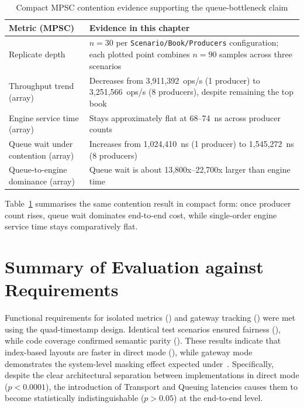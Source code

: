 \begin{table}[htbp]
    \centering
    \small
    \begin{tabular}{p{}p{}}
        \toprule
        \textbf{Metric (MPSC)} & \textbf{Evidence in this chapter} \\
        \midrule
        Replicate depth & $n=30$ per \texttt{Scenario/Book/Producers} configuration; each plotted point combines $n=90$ samples across three scenarios \\
        Throughput trend (array) & Decreases from 3,911,392~ops/s (1 producer) to 3,251,566~ops/s (8 producers), despite remaining the top book \\
        Engine service time (array) & Stays approximately flat at 68--74~ns across producer counts \\
        Queue wait under contention (array) & Increases from 1,024,410~ns (1 producer) to 1,545,272~ns (8 producers) \\
        Queue-to-engine dominance (array) & Queue wait is about 13,800x--22,700x larger than engine time \\
        \bottomrule
    \end{tabular}
    \caption{Compact MPSC contention evidence supporting the queue-bottleneck claim}
    \label{tab:mpsc_compact_evidence}
\end{table}

Table~\ref{tab:mpsc_compact_evidence} summarises the same contention result in
compact form: once producer count rises, queue wait dominates end-to-end cost,
while single-order engine service time stays comparatively flat.
\section{Summary of Evaluation against Requirements}
\label{sec:nfr_summary}

Functional requirements for isolated metrics () and gateway 
tracking () were met using the quad-timestamp design. 
Identical test scenarios ensured fairness (), while code coverage confirmed 
semantic parity (). These results indicate that index-based layouts are 
faster in direct mode (), while gateway mode demonstrates the 
system-level masking effect expected under~. Specifically, 
despite the clear architectural separation between implementations in 
direct mode ($p<0.0001$), the introduction of Transport and Queuing 
latencies causes them to become statistically indistinguishable ($p>0.05$) 
at the end-to-end level.

